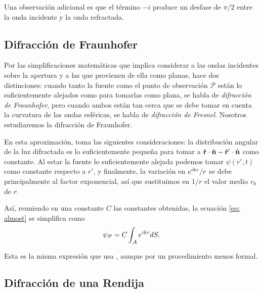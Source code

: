 \begin{multicols}{2}
Una observación adicional es que el término $-i$ produce un desfase de $\pi/2$ entre la onda incidente y la onda refractada.

\subsection{Difracción de Fraunhofer}
Por las simplificaciones matemáticas que implica considerar a las ondas incidentes sobre la apertura y a las que provienen de ella como planas, \parencite{hecht-1999} hace dos distinciones: cuando tanto la fuente como el punto de observación $\mathcal P$ están lo suficientemente alejados como para tomarlas como plana, se habla de \textit{difracción de Fraunhofer}, pero cuando ambos están tan cerca que se debe tomar en cuenta la curvatura de las ondas esféricas, se habla de \textit{difracción de Fresnel}. Nosotros estudiaremos la difracción de Fraunhofer.

En esta aproximación, \parencite{fowles-1989} toma las siguientes consideraciones: la distribución angular de la luz difractada es lo suficientemente pequeña para tomar a $\hat{\mathbf{r}} \cdot \hat{\mathbf{n}} - \hat{\mathbf{r}}' \cdot \hat{\mathbf{n}}$ como constante. Al estar la fuente lo suficientemente alejada podemos tomar $\psi(r', t)$ como constante respecto a $r'$, y finalmente, la variación en $e^{ikr}/r$ se debe principalmente al factor exponencial, así que sustituimos en $1/r$ el valor medio $r_0$ de $r$.

Así, reuniendo en una constante $C$ las constantes obtenidas, la ecuación \eqref{eq: almost} se simplifica como
\begin{equation}
	\psi_{\mathcal P} = C \int_{\mathcal A} e^{ikr} dS.
\end{equation}

Esta es la misma expresión que usa \parencite{hecht-1999}, aunque por un procedimiento menos formal.

\subsection{Difracción de una Rendija}\label{sec: una}


\end{multicols}
